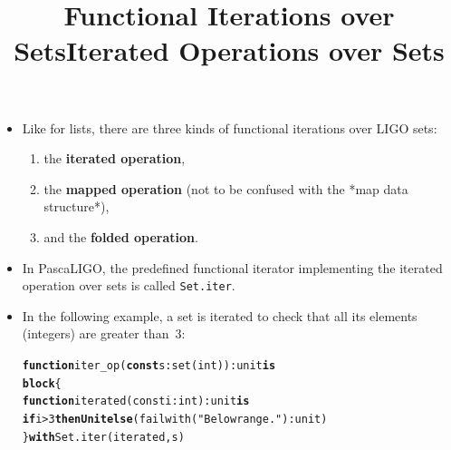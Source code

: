 \documentclass[wide]{slides}
\newcommand{\Kblock}[0]{\textbf{block}\xspace}
\newcommand{\Kconst}[0]{\textbf{const}\xspace}
\newcommand{\Kelse}[0]{\textbf{else}\xspace}
\newcommand{\Kfunction}[0]{\textbf{function}\xspace}
\newcommand{\Kif}[0]{\textbf{if}\xspace}
\newcommand{\Kis}[0]{\textbf{is}\xspace}
\newcommand{\Kthen}[0]{\textbf{then}\xspace}
\newcommand{\KUnit}[0]{\textbf{Unit}\xspace}
\newcommand{\Kwith}[0]{\textbf{with}\xspace}
\begin{document}
\begin{slide}
  \title{Functional Iterations over Sets}

  \begin{itemize}

  \item Like for lists, there are three kinds of functional iterations
    over LIGO sets:
      \begin{enumerate}

        \item the \textbf{iterated operation},

        \item the \textbf{mapped operation} (not to be
          confused with the *map data structure*),

        \item and the \textbf{folded operation}.

      \end{enumerate}

  \end{itemize}

\end{slide}

\begin{slide}
  \title{Iterated Operations over Sets}

  \begin{itemize}

    \item In PascaLIGO, the predefined functional iterator
      implementing the iterated operation over sets is called
      \texttt{Set.iter}.

    \item In the following example, a set is iterated to check that
      all its elements (integers) are greater than~\(3\):
      \begin{alltt}
\Kfunction iter_op (\Kconst s : set (int)) : unit \Kis
  \Kblock \{
    \Kfunction iterated (const i : int) : unit \Kis
      \Kif i > 3 \Kthen \KUnit \Kelse (failwith ("Below range.") : unit)
  \} \Kwith Set.iter (iterated, s)
      \end{alltt}

  \end{itemize}

\end{slide}
\end{document}
